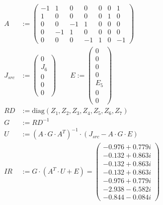 \begin{align*}
A &:= \begin{pmatrix} 
-1 & 1 & 0 & 0 & 0 & 0 & 1 \\ 
1 & 0 & 0 & 0 & 0 & 1 & 0 \\ 
0 & 0 & -1 & 1 & 0 & 0 & 0 \\ 
0 & -1 & 1 & 0 & 0 & 0 & 0 \\ 
0 & 0 & 0 & -1 & 1 & 0 & -1 
\end{pmatrix} \\[1em]
J_{src} &:= \begin{pmatrix} 0 \\ J_6 \\ 0 \\ 0 \\ 0 \end{pmatrix} \quad\quad E := \begin{pmatrix} 0 \\ 0 \\ 0 \\ 0 \\ E_5 \\ 0 \\ 0 \end{pmatrix} \\[1em]
RD &:= \text{diag}(Z_1, Z_2, Z_3, Z_4, Z_5, Z_6, Z_7) \\[1em]
G &:= RD^{-1} \\[1em]
U &:= (A \cdot G \cdot A^T)^{-1} \cdot (J_{src} - A \cdot G \cdot E) \\[1em]
IR &:= G \cdot (A^T \cdot U + E) = \begin{pmatrix} 
-0.976 + 0.779i \\ 
-0.132 + 0.863i \\ 
-0.132 + 0.863i \\ 
-0.132 + 0.863i \\ 
-0.976 + 0.779i \\ 
-2.938 - 6.582i \\ 
-0.844 - 0.084i 
\end{pmatrix}
\end{align*}
